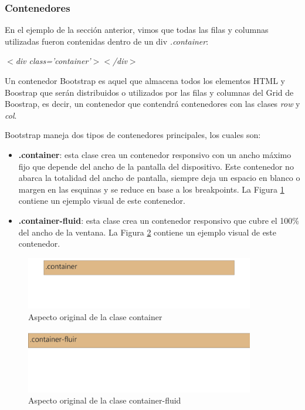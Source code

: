 \subsubsection{Contenedores}

En el ejemplo de la sección anterior, vimos que todas las filas y columnas utilizadas fueron contenidas dentro de un div \textit{.container}:
\begin{center}
    \textit{$<$div class='container'$>$$<$/div$>$}
\end{center}

Un contenedor Bootstrap es aquel que almacena todos los elementos HTML y Boostrap que serán distribuidos o utilizados por las filas y columnas del Grid de Boostrap, es decir, un contenedor que contendrá contenedores con las clases \textit{row} y \textit{col}.

Bootstrap maneja dos tipos de contenedores principales, los cuales son:
\begin{itemize}
    \item \textbf{.container}: esta clase crea un contenedor responsivo con un ancho máximo fijo que depende del ancho de la pantalla del dispositivo. Este contenedor no abarca la totalidad del ancho de pantalla, siempre deja un espacio en blanco o margen en las esquinas y se reduce en base a los breakpoints. La Figura \ref{fig:10} contiene un ejemplo visual de este contenedor.
    \item \textbf{.container-fluid}: esta clase crea un contenedor responsivo que cubre el 100\% del ancho de la ventana. La Figura \ref{fig:11} contiene un ejemplo visual de este contenedor.
\end{itemize}
\begin{figure}[H]
    \centering
    \caption{Aspecto original de la clase container}
    \label{fig:10}
    \includegraphics[width=10cm]{ss/container.png}
\end{figure}
\begin{figure}[H]
    \centering
    \caption{Aspecto original de la clase container-fluid}
    \label{fig:11}
    \includegraphics[width=10cm]{ss/container-fluid.png}
\end{figure}

